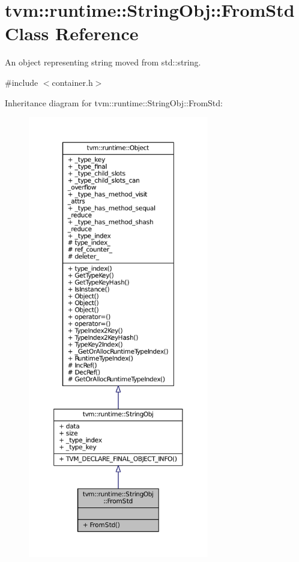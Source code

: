 \hypertarget{classtvm_1_1runtime_1_1StringObj_1_1FromStd}{}\section{tvm\+:\+:runtime\+:\+:String\+Obj\+:\+:From\+Std Class Reference}
\label{classtvm_1_1runtime_1_1StringObj_1_1FromStd}


An object representing string moved from std\+::string.  




{\ttfamily \#include $<$container.\+h$>$}



Inheritance diagram for tvm\+:\+:runtime\+:\+:String\+Obj\+:\+:From\+Std\+:
\nopagebreak
\begin{figure}[H]
\begin{center}
\leavevmode
\includegraphics[height=550pt]{classtvm_1_1runtime_1_1StringObj_1_1FromStd__inherit__graph}
\end{center}
\end{figure}


